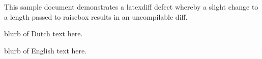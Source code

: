 \documentclass{minimal}
\begin{document}
This sample document demonstrates a latexdiff defect whereby
a slight change to a length passed to raisebox results in an uncompilable diff.\\

\noindent\begin{minipage}[b]{0.32\textwidth}%
  blurb of Dutch text here.%
\end{minipage}\hfill%
\hfill%
\noindent\begin{minipage}[b]{0.28\textwidth}%
   blurb of English text here.%
\end{minipage}%
\end{document}
